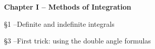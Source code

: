 

\def\chapter#1#2{

{\bf Chapter #1 -- #2} }
\def\section#1#2{

\quad\S #1 --#2 }
\def\subsection#1#2{}
%
\def\subsubsection#1#2{}
%
\def\ref#1{(--)}


\chapter{I}{Methods of Integration}
\section{1}{Definite and indefinite integrals}
\subsection{1.1}{Definition}

\section{3}{First trick: using the double angle formulas}
\subsection{3.1}{The double angle formulas}
\subsubsection{3.1.1}{Example}
\subsubsection{3.1.2}{A more complicated example}
\subsubsection{3.1.3}{Example without the double angle trick}

